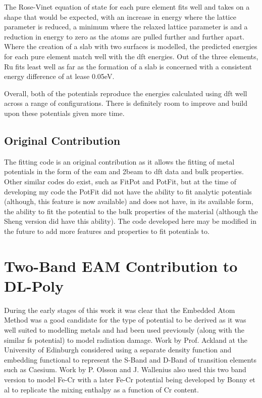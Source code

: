 The Rose-Vinet equation of state for each pure element fits well and takes on a shape that would be expected, with an increase in energy where the lattice parameter is reduced, a minimum where the relaxed lattice parameter is and a reduction in energy to zero as the atoms are pulled further and further apart.  Where the creation of a slab with two surfaces is modelled, the predicted energies for each pure element match well with the \acrshort{dft} energies.  Out of the three elements, Ru fits least well as far as the formation of a slab is concerned with a consistent energy difference of at lease 0.05eV.

Overall, both of the potentials reproduce the energies calculated using \acrshort{dft} well across a range of configurations.  There is definitely room to improve and build upon these potentials given more time.

\subsection{Original Contribution}

The fitting code is an original contribution as it allows the fitting of metal potentials in the form of the \acrlong{eam} and \acrlong{2beam} to \acrshort{dft} data and bulk properties.  Other similar codes do exist, such as FitPot and PotFit, but at the time of developing my code the PotFit did not have the ability to fit analytic potentials (although, this feature is now available) and does not have, in its available form, the ability to fit the potential to the bulk properties of the material (although the Sheng version did have this ability).  The code developed here may be modified in the future to add more features and properties to fit potentials to. 



\section{Two-Band EAM Contribution to DL-Poly}

During the early stages of this work it was clear that the Embedded Atom Method was a good candidate for the type of potential to be derived as it was well suited to modelling metals and had been used previously (along with the similar \acrshort{fs} potential) to model radiation damage\cite{damagebcciron}.  Work by Prof. Ackland at the University of Edinburgh considered using a separate density function and embedding functional to represent the S-Band and D-Band of transition elements such as Caesium.  Work by P. Olsson and J. Wallenius also used this two band version to model Fe-Cr with a later Fe-Cr potential being developed by Bonny et al to replicate the mixing enthalpy as a function of Cr content.  

